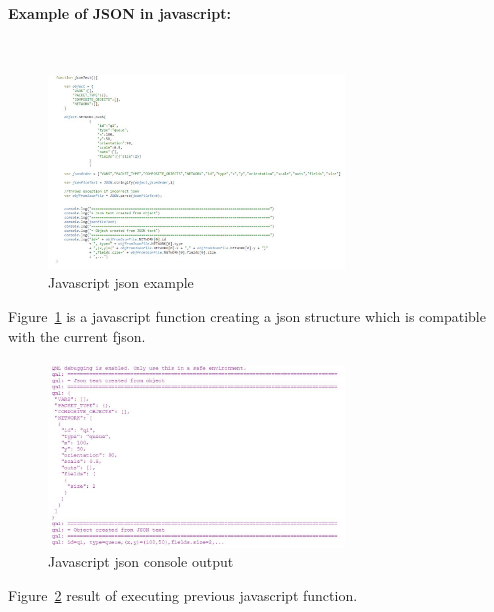 \documentclass[a4paper,11pt,final]{article}
\begin{document}
\paragraph{Example of JSON in javascript:}\

\begin{figure}[here]
\includegraphics[width=0.70\textwidth]{js_json}
\caption{Javascript json example}
\label{fig:js_json}
\end{figure}
Figure~\ref{fig:js_json} is a javascript function creating a json structure
which is compatible with the current fjson.

\paragraph{}
\begin{figure}[here]
\includegraphics[width=0.70\textwidth]{js_json_result}
\caption{Javascript json console output}
\label{fig:js_json_result}
\end{figure}
Figure~\ref{fig:js_json_result} result of executing previous javascript function.

\newpage
\end{document}
